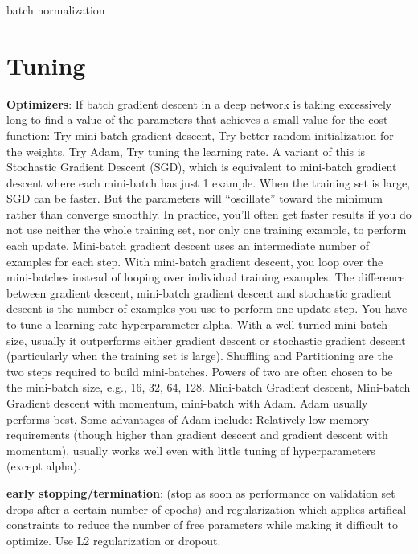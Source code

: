\documentclass[]{book}
\begin{document}
batch normalization

\section{Tuning}\label{tuning}

\textbf{Optimizers}: If batch gradient descent in a deep network is
taking excessively long to find a value of the parameters that achieves
a small value for the cost function: Try mini-batch gradient descent,
Try better random initialization for the weights, Try Adam, Try tuning
the learning rate. A variant of this is Stochastic Gradient Descent
(SGD), which is equivalent to mini-batch gradient descent where each
mini-batch has just 1 example. When the training set is large, SGD can
be faster. But the parameters will ``oscillate'' toward the minimum
rather than converge smoothly. In practice, you'll often get faster
results if you do not use neither the whole training set, nor only one
training example, to perform each update. Mini-batch gradient descent
uses an intermediate number of examples for each step. With mini-batch
gradient descent, you loop over the mini-batches instead of looping over
individual training examples. The difference between gradient descent,
mini-batch gradient descent and stochastic gradient descent is the
number of examples you use to perform one update step. You have to tune
a learning rate hyperparameter alpha. With a well-turned mini-batch
size, usually it outperforms either gradient descent or stochastic
gradient descent (particularly when the training set is large).
Shuffling and Partitioning are the two steps required to build
mini-batches. Powers of two are often chosen to be the mini-batch size,
e.g., 16, 32, 64, 128. Mini-batch Gradient descent, Mini-batch Gradient
descent with momentum, mini-batch with Adam. Adam usually performs best.
Some advantages of Adam include: Relatively low memory requirements
(though higher than gradient descent and gradient descent with
momentum), usually works well even with little tuning of hyperparameters
(except alpha).

\textbf{early stopping/termination}: (stop as soon as performance on
validation set drops after a certain number of epochs) and
regularization which applies artifical constraints to reduce the number
of free parameters while making it difficult to optimize. Use L2
regularization or dropout.
\end{document}
